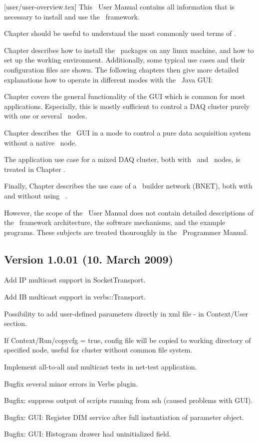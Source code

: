 [user/user-overview.tex]
This \dabc\ User Manual contains all information that is necessary to
install and use the \dabc\ framework.

Chapter  should be useful to understand the
most commonly used terms of \dabc.

Chapter  describes how to install the
\dabc\ packages on any linux machine, and how to set up the working
environment. Additionally, some typical use cases and their configuration
files are shown. 
The following chapters then give more detailed explanations how to operate
in different modes with the \dabc\ Java GUI:

Chapter 
covers the general functionality of the GUI
which is common for most applications. Especially, this 
is mostly sufficient
to control a DAQ cluster purely with one or several \dabc\ nodes.

Chapter  describes the \dabc\ GUI 
in a mode to control a pure \mbs data acquisition system without 
a native \dabc\ node.

The application use case for a mixed DAQ cluster, both with \dabc\ and \mbs\ nodes, is
treated in Chapter .

Finally, Chapter  describes the use case of
a \dabc\ builder network (BNET), both with and without using \mbs\ .

However, the scope of the \dabc\ User Manual does not contain 
detailed descriptions of the \dabc\ framework architecture, 
the software mechanisms, and the example programs. 
These subjects are treated thouroughly
in the \dabc\ Programmer Manual.


\subsection{Version 1.0.01 (10. March 2009)}
\bnum
\item Add IP multicast support in SocketTransport.
\item Add IB multicast support in verbs::Transport.
\item Possibility to add user-defined parameters directly in xml file - 
      in Context/User section.
\item If Context/Run/copycfg = true, config file will be copied to working
      directory of specified node, useful for cluster without common file system.
\item Implement all-to-all and multicast tests in net-test application.
\item Bugfix several minor errors in Verbs plugin.
\item Bugfix: suppress output of scripts running from ssh (caused problems with GUI).
\item Bugfix: GUI: Register DIM service after full instantiation of parameter object.
\item Bugfix: GUI: Histogram drawer had uninitialized field.
\enum


